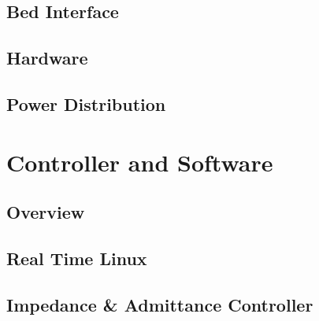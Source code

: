 \documentclass[12pt]{report}
\begin{document}
	\subsection{Bed Interface}
%
	\subsection{Hardware}
%
	\subsection{Power Distribution}

\section{Controller and Software}

	\subsection{Overview}
		
	\subsection{Real Time Linux}
	
%

		
	
	\subsection{Impedance \& Admittance Controller}

%
\end{document}
